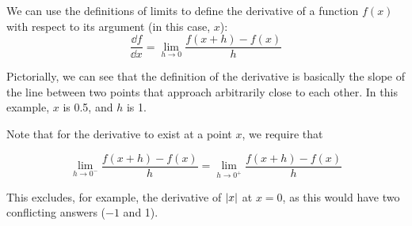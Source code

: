 \documentclass{article}
\begin{document}
	\begin{wrapfigure}{l}{0.5\textwidth}
	\end{wrapfigure}

	\begin{definition}[Derivative]
		We can use the definitions of limits to define the derivative of a function $f(x)$ with respect to its argument (in this case, $x$):
		\begin{equation}\label{derivative}
			\frac{\dd f}{\dd x} = \lim_{h \to 0} \frac{f(x+h)-f(x)}{h}
		\end{equation}
	\end{definition}

	Pictorially, we can see that the definition of the derivative is basically the slope of the line between two points that approach arbitrarily close to each other. In this example, $x$ is 0.5, and $h$ is 1.
	
	Note that for the derivative to exist at a point $x$, we require that
	
	\[ \lim_{h \to 0^-} \frac{f(x+h)-f(x)}{h} = \lim_{h \to 0^+} \frac{f(x+h)-f(x)}{h} \]
	
	This excludes, for example, the derivative of $\abs{x}$ at $x=0$, as this would have two conflicting answers ($-1$ and 1).
	
\end{document}
